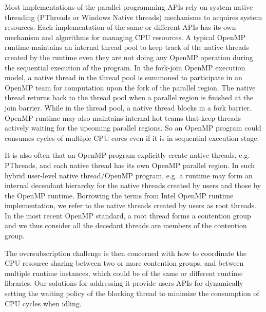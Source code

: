 
Most implementations of the parallel programming APIs rely on system 
native threading (PThreads or Windows Native threads) mechanisms to acquires system resources. 
Each implementation of the same or different APIs has its own mechanism and algorithms for managing
CPU resources. 
A typical OpenMP runtime maintains 
an internal thread pool to keep track of the native threads created by the runtime even they are not  
doing any OpenMP operation during the sequential execution of the program. 
In the fork-join OpenMP execution model, a native thread in the thread pool 
is summoned to participate in an OpenMP team for computation upon the fork of the {\sf parallel} region. 
The native thread returns back to the thread pool when a parallel 
region is finished at the join barrier. While in the 
thread pool, a native thread blocks in a fork barrier. 
OpenMP runtime may also
maintains internal hot teams that keep threads actively waiting for the upcoming parallel regions. 
So an OpenMP program could consumes cycles of multiple CPU cores even if it is in sequential execution stage.


It is also often that an OpenMP program explicitly create native threads, e.g. PThreads, and each native thread has
its own OpenMP {\sf parallel} region. 
In such hybrid user-level native thread/OpenMP program, e.g. 
a runtime may form an internal decendant hierarchy for the native threads created by users and
those by the OpenMP runtime. Borrowing the terms from Intel OpenMP runtime implementation, we refer to 
the native threads created by users as root threads. 
In the most recent OpenMP standard, a root thread forms a contention group and we thus 
consider all the decedant threads are members of the contention group. 


The oversubscription challenge is then concerned with how 
to coordinate the CPU resource sharing between two or more contention groups, and between multiple 
runtime instances, which could be of the same or different runtime libraries. 
Our solutions for addressing it provide users APIs for 
dynamically setting the waiting policy of the blocking thread to minimize 
the consumption of CPU cycles when idling. 


